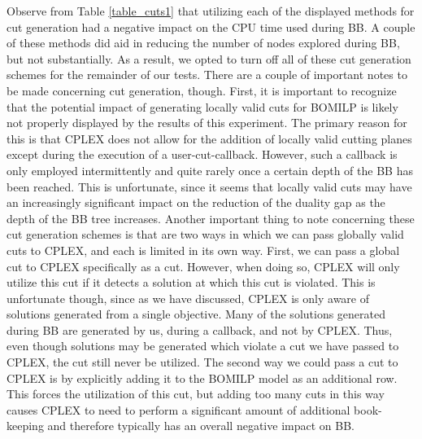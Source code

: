 \documentclass[11.5pt]{article}
\begin{document}
Observe from Table \ref{table_cuts1} that utilizing each of the displayed methods for cut generation had a negative impact on the CPU time used during BB. A couple of these methods did aid in reducing the number of nodes explored during BB, but not substantially. As a result, we opted to turn off all of these cut generation schemes for the remainder of our tests. There are a couple of important notes to be made concerning cut generation, though. First, it is important to recognize that the potential impact of generating locally valid cuts for BOMILP is likely not properly displayed by the results of this experiment. The primary reason for this is that CPLEX does not allow for the addition of locally valid cutting planes except during the execution of a user-cut-callback. However, such a callback is only employed intermittently and quite rarely once a certain depth of the BB has been reached. This is unfortunate, since it seems that locally valid cuts may have an increasingly significant impact on the reduction of the duality gap as the depth of the BB tree increases. Another important thing to note concerning these cut generation schemes is that are two ways in which we can pass globally valid cuts to CPLEX, and each is limited in its own way. First, we can pass a global cut to CPLEX specifically as a cut. However, when doing so, CPLEX will only utilize this cut if it detects a solution at which this cut is violated. This is unfortunate though, since as we have discussed, CPLEX is only aware of solutions generated from a single objective. Many of the solutions generated during BB are generated by us, during a callback, and not by CPLEX. Thus, even though solutions may be generated which violate a cut we have passed to CPLEX, the cut still never be utilized. The second way we could pass a cut to CPLEX is by explicitly adding it to the BOMILP model as an additional row. This forces the utilization of this cut, but adding too many cuts in this way causes CPLEX to need to perform a significant amount of additional book-keeping and therefore typically has an overall negative impact on BB. 
\end{document}
